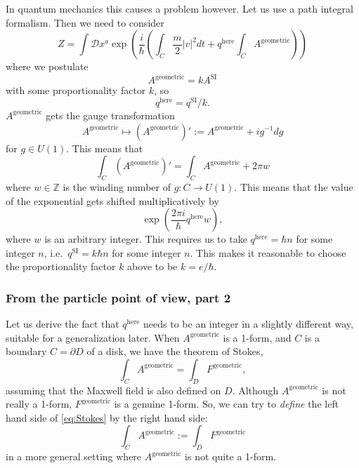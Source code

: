 \documentclass[12pt]{article}
\numberwithin{equation}{section}
\theoremstyle{remark}
\def\bZ{\mathbb{Z}}
\begin{document}
In quantum mechanics this causes a problem however. 
Let us use a path integral formalism. Then we need to consider \begin{equation}
Z=\int \mathcal D x^a \exp\left( \frac{i}{\hbar}(\int_C \frac m2 |v|^2 dt  +  q^\text{here} \int_C A^\text{geometric}) \right) 
\end{equation}
where we postulate \begin{equation}
A^\text{geometric} = k A^\text{SI}
\end{equation}
with some proportionality factor $k$, so \begin{equation}
q^\text{here} = q^\text{SI}/k.
\end{equation}
$A^\text{geometric} $ gets the gauge transformation \begin{equation}
A^\text{geometric} \mapsto  (A^\text{geometric}) ' := A^\text{geometric} +  i g^{-1} d g
\end{equation}  for $g\in U(1)$.
This means that \begin{equation}
\int_C (A^\text{geometric})'
=
\int_C A^\text{geometric}
+  2\pi w
\end{equation}
where $w\in \bZ$ is the winding number of $g:C\to U(1)$.
This means that the value of the exponential gets shifted multiplicatively by \begin{equation}
\exp(\frac{2\pi i}{\hbar} q^\text{here} w ),
\end{equation} where $w$ is an arbitrary integer.
This requires us to take $q^\text{here}=\hbar n$ for some integer $n$,
i.e.~$q^\text{SI}= k \hbar n $ for some integer $n$.
This makes it reasonable to choose the proportionality factor $k$ above to be $k=e/\hbar$.

\subsubsection{From the particle point of view, part 2}

Let us derive the fact that $q^\text{here}$ needs to be an integer in a slightly different way,
suitable for a generalization later. 
When $A^\text{geometric}$ is a 1-form, and $C$ is a boundary $C=\partial D$ of a disk,
we have the theorem of Stokes, \begin{equation}
\int _C A^\text{geometric} = \int_D F^\text{geometric},
\label{eq:Stokes}
\end{equation}
assuming that the Maxwell field is also defined on $D$.
Although $A^\text{geometric}$ is not really a 1-form,
$F^\text{geometric}$ is a genuine 1-form.
So, we can try to \emph{define} the left hand side of \eqref{eq:Stokes} by the right hand side: \begin{equation}
\int _C A^\text{geometric} := \int_D F^\text{geometric}
\end{equation}
in a more general setting where $A^\text{geometric}$ is not quite a 1-form.
\end{document}
